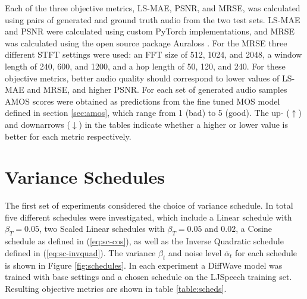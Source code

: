\documentclass{report}
\begin{document}
Each of the three objective metrics, LS-MAE, PSNR, and MRSE, was calculated using pairs of generated and ground truth audio from the two test sets. LS-MAE and PSNR were calculated using custom PyTorch implementations, and MRSE was calculated using the open source package Auraloss \cite{steinmetz2020auraloss}. For the MRSE three different STFT settings were used: an FFT size of 512, 1024, and 2048, a window length of 240, 600, and 1200, and a hop length of 50, 120, and 240. For these objective metrics, better audio quality should correspond to lower values of LS-MAE and MRSE, and higher PSNR. For each set of generated audio samples AMOS scores were obtained as predictions from the fine tuned MOS model defined in section \ref{sec:amos}, which range from 1 (bad) to 5 (good). The up- ($\uparrow$) and downarrows ($\downarrow$) in the tables indicate whether a higher or lower value is better for each metric respectively. 

\section{Variance Schedules} \label{sec:varscheds}
The first set of experiments considered the choice of variance schedule. In total five different schedules were investigated, which include a Linear schedule with $\beta_T=0.05$, two Scaled Linear schedules with $\beta_T=0.05$ and $0.02$, a Cosine schedule as defined in (\ref{eq:sc-cos}), as well as the Inverse Quadratic schedule defined in (\ref{eq:sc-invquad}). The variance $\beta_t$ and noise level $\bar{\alpha}_t$ for each schedule is shown in Figure \ref{fig:schedules}. In each experiment a DiffWave model was trained with base settings and a chosen schedule on the LJSpeech training set. Resulting objective metrics are shown in table \ref{table:scheds}. 
\end{document}
